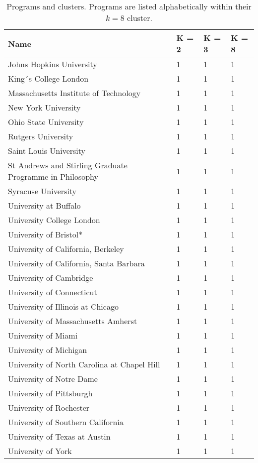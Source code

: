 
\begin{longtable}[t]{llll}
\caption{\label{tab:university.cluster}Programs and clusters.  Programs are listed alphabetically within their $k=8$ cluster.}\\
\toprule
Name & K = 2 & K = 3 & K = 8\\
\midrule
Johns Hopkins University & 1 & 1 & 1\\
King´s College London & 1 & 1 & 1\\
Massachusetts Institute of Technology & 1 & 1 & 1\\
New York University & 1 & 1 & 1\\
Ohio State University & 1 & 1 & 1\\
\addlinespace
Rutgers University & 1 & 1 & 1\\
Saint Louis University & 1 & 1 & 1\\
St Andrews and Stirling Graduate Programme in Philosophy & 1 & 1 & 1\\
Syracuse University & 1 & 1 & 1\\
University at Buffalo & 1 & 1 & 1\\
\addlinespace
University College London & 1 & 1 & 1\\
University of Bristol* & 1 & 1 & 1\\
University of California, Berkeley & 1 & 1 & 1\\
University of California, Santa Barbara & 1 & 1 & 1\\
University of Cambridge & 1 & 1 & 1\\
\addlinespace
University of Connecticut & 1 & 1 & 1\\
University of Illinois at Chicago & 1 & 1 & 1\\
University of Massachusetts Amherst & 1 & 1 & 1\\
University of Miami & 1 & 1 & 1\\
University of Michigan & 1 & 1 & 1\\
\addlinespace
University of North Carolina at Chapel Hill & 1 & 1 & 1\\
University of Notre Dame & 1 & 1 & 1\\
University of Pittsburgh & 1 & 1 & 1\\
University of Rochester & 1 & 1 & 1\\
University of Southern California & 1 & 1 & 1\\
\addlinespace
University of Texas at Austin & 1 & 1 & 1\\
University of York & 1 & 1 & 1\\

\end{longtable}
